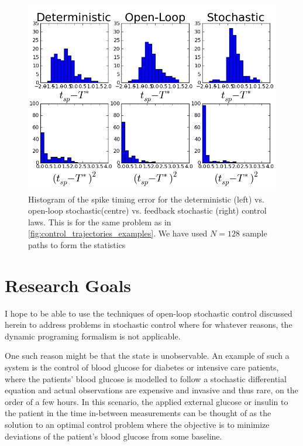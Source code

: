 \documentclass{article}
\begin{document}
\begin{figure}[h]
\begin{center}
  \includegraphics[width=.95\textwidth]
  {Figs/ControlSimulator/3controls_example_trajectories_hists.png}
  \caption[labelInTOC]{Histogram of the spike timing error for the
  deterministic (left) vs. open-loop stochastic(centre) vs. feedback stochastic
  (right) control laws. This is for the same problem as in
  \cref{fig:control_trajectories_examples}. We have used $N=128$ sample paths
  to form the statistics}
  \label{fig:error_histograms_det_vs_openloop_vs_stoch} 
\end{center}
\end{figure}


\section{Research Goals}
I hope to be able to use the techniques of open-loop stochastic control
discussed herein to address problems in stochastic control where for whatever
reasons, the dynamic programing formalism is not applicable. 

One such reason might be that the state is unobservable. An example of such a
system is the control of blood glucose for diabetes or intensive care
patients, where the patients' blood glucose is modelled to follow a stochastic
differential equation and actual observations are expensive and invasive and
thus rare, on the order of a few hours. In this scenario, the applied external
glucose or insulin to the patient in the time in-between measurements can be
thought of as the solution to an optimal control problem where the objective is
to minimize deviations of the patient's blood glucose from some baseline. 
\end{document}
